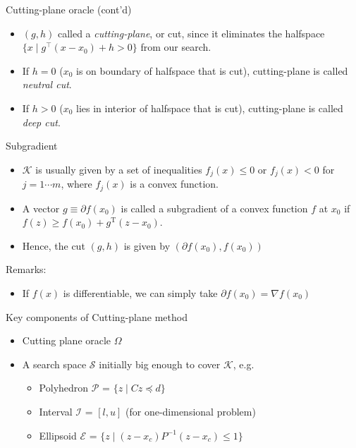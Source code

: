 \documentclass[10pt,ignorenonframetext,serif,onlymath]{beamer}
\providecommand{\tightlist}{%
  \setlength{\itemsep}{0pt}\setlength{\parskip}{0pt}}
\begin{document}
\begin{frame}{Cutting-plane oracle (cont’d)}
\protect\hypertarget{sec:cutting-plane-oracle-contd}{}

\begin{itemize}
\item
  \((g,h)\) called a \emph{cutting-plane}, or cut, since it eliminates
  the halfspace \(\{x \mid g^\top (x - x_0) + h > 0\}\) from our search.
\item
  If \(h=0\) (\(x_0\) is on boundary of halfspace that is cut),
  cutting-plane is called \emph{neutral cut}.
\item
  If \(h>0\) (\(x_0\) lies in interior of halfspace that is cut),
  cutting-plane is called \emph{deep cut}.
\end{itemize}

\end{frame}

\begin{frame}{Subgradient}
\protect\hypertarget{sec:subgradient}{}

\begin{itemize}
\tightlist
\item
  \(\mathcal{K}\) is usually given by a set of inequalities
  \(f_j(x) \le 0\) or \(f_j(x) < 0\) for \(j = 1 \cdots m\), where
  \(f_j(x)\) is a convex function.
\item
  A vector \(g \equiv \partial f(x_0)\) is called a subgradient of a
  convex function \(f\) at \(x_0\) if
  \(f(z) \geq f(x_0) + g^\mathrm{T} (z - x_0)\).
\item
  Hence, the cut \((g, h)\) is given by \((\partial f(x_0), f(x_0))\)
\end{itemize}

Remarks:

\begin{itemize}
\tightlist
\item
  If \(f(x)\) is differentiable, we can simply take
  \(\partial f(x_0) = \nabla f(x_0)\)
\end{itemize}

\end{frame}

\begin{frame}{Key components of Cutting-plane method}
\protect\hypertarget{sec:key-components-of-cutting-plane-method}{}

\begin{itemize}
\tightlist
\item
  Cutting plane oracle \(\Omega\)
\item
  A search space \(\mathcal{S}\) initially big enough to cover
  \(\mathcal{K}\), e.g.

  \begin{itemize}
  \tightlist
  \item
    Polyhedron \(\mathcal{P}\) = \(\{z \mid C z \preceq d \}\)
  \item
    Interval \(\mathcal{I}\) = \([l, u]\) (for one-dimensional problem)
  \item
    Ellipsoid \(\mathcal{E}\) =
    \(\{z \mid (z-x_c)P^{-1}(z-x_c) \leq 1 \}\)
  \end{itemize}
\end{itemize}

\end{frame}
\end{document}
